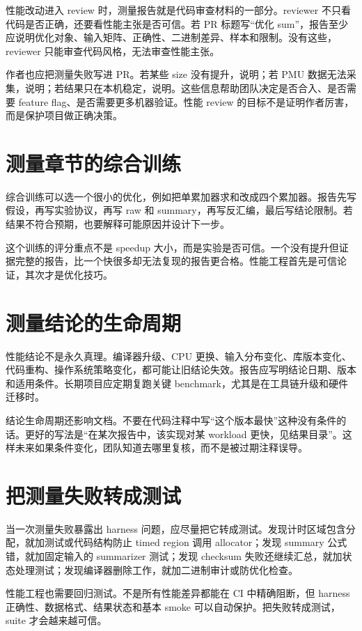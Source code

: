 性能改动进入 review 时，测量报告就是代码审查材料的一部分。reviewer 不只看代码是否正确，还要看性能主张是否可信。若 PR 标题写“优化 sum”，报告至少应说明优化对象、输入矩阵、正确性、二进制差异、样本和限制。没有这些，reviewer 只能审查代码风格，无法审查性能主张。

作者也应把测量失败写进 PR。若某些 size 没有提升，说明；若 PMU 数据无法采集，说明；若结果只在本机稳定，说明。这些信息帮助团队决定是否合入、是否需要 feature flag、是否需要更多机器验证。性能 review 的目标不是证明作者厉害，而是保护项目做正确决策。

\section{测量章节的综合训练}

综合训练可以选一个很小的优化，例如把单累加器求和改成四个累加器。报告先写假设，再写实验协议，再写 raw 和 summary，再写反汇编，最后写结论限制。若结果不符合预期，也要解释可能原因并设计下一步。

这个训练的评分重点不是 speedup 大小，而是实验是否可信。一个没有提升但证据完整的报告，比一个快很多却无法复现的报告更合格。性能工程首先是可信论证，其次才是优化技巧。

\section{测量结论的生命周期}

性能结论不是永久真理。编译器升级、CPU 更换、输入分布变化、库版本变化、代码重构、操作系统策略变化，都可能让旧结论失效。报告应写明结论日期、版本和适用条件。长期项目应定期复跑关键 benchmark，尤其是在工具链升级和硬件迁移时。

结论生命周期还影响文档。不要在代码注释中写“这个版本最快”这种没有条件的话。更好的写法是“在某次报告中，该实现对某 workload 更快，见结果目录”。这样未来如果条件变化，团队知道去哪里复核，而不是被过期注释误导。

\section{把测量失败转成测试}

当一次测量失败暴露出 harness 问题，应尽量把它转成测试。发现计时区域包含分配，就加测试或代码结构防止 timed region 调用 allocator；发现 summary 公式错，就加固定输入的 summarizer 测试；发现 checksum 失败还继续汇总，就加状态处理测试；发现编译器删除工作，就加二进制审计或防优化检查。

性能工程也需要回归测试。不是所有性能差异都能在 CI 中精确阻断，但 harness 正确性、数据格式、结果状态和基本 smoke 可以自动保护。把失败转成测试，suite 才会越来越可信。


